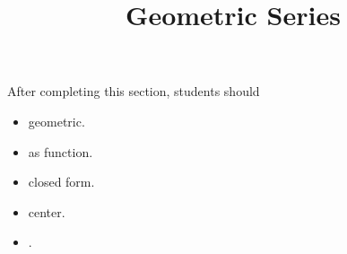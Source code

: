 \documentclass{ximera}
\title{Geometric Series}
\begin{document}
\begin{abstract}
\end{abstract}
\maketitle

\begin{sectionOutcomes}
After completing this section, students should 

\begin{itemize}
\item geometric.
\item as function.
\item closed form.
\item center.
\item .
\end{itemize}
\end{sectionOutcomes}
\end{document}

